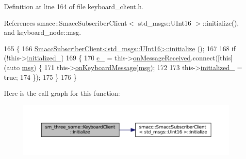Definition at line 164 of file keyboard\+\_\+client.\+h.



References smacc\+::\+Smacc\+Subscriber\+Client$<$ std\+\_\+msgs\+::\+U\+Int16 $>$\+::initialize(), and keyboard\+\_\+node\+::msg.


\begin{DoxyCode}
165         \{
166                 \hyperlink{classsmacc_1_1SmaccSubscriberClient_acfa97685ecc588fe61eb57002354b58a}{SmaccSubscriberClient<std\_msgs::UInt16>::initialize}
      ();
167 
168                 \textcolor{keywordflow}{if} (!this->\hyperlink{classsm__three__some_1_1KeyboardClient_ab374495b4e0587afa6f09da97f4df615}{initialized\_})
169                 \{
170                         \hyperlink{classsm__three__some_1_1KeyboardClient_aa4505f5952e5caeb9ee4e1a7d6c85d53}{c\_} = this->\hyperlink{classsmacc_1_1SmaccSubscriberClient_a7635fbb013c6fdbc3998da11b44766bb}{onMessageReceived}.connect([\textcolor{keyword}{this}](\textcolor{keyword}{auto} 
      \hyperlink{namespacekeyboard__node_a768777e12f75b89e4a0a60acf748e9eb}{msg}) \{
171                                 this->\hyperlink{classsm__three__some_1_1KeyboardClient_ad793e68532acd85b1e1fd17c8df827e5}{onKeyboardMessage}(\hyperlink{namespacekeyboard__node_a768777e12f75b89e4a0a60acf748e9eb}{msg});
172 
173                                 this->\hyperlink{classsm__three__some_1_1KeyboardClient_ab374495b4e0587afa6f09da97f4df615}{initialized\_} = \textcolor{keyword}{true};
174                         \});
175                 \}
176         \}
\end{DoxyCode}


Here is the call graph for this function\+:
\nopagebreak
\begin{figure}[H]
\begin{center}
\leavevmode
\includegraphics[width=350pt]{classsm__three__some_1_1KeyboardClient_a8a74266ba37df7f09518b9689ddee828_cgraph}
\end{center}
\end{figure}


